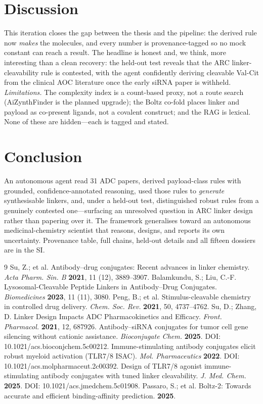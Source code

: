 \documentclass[10pt]{article}
\begin{document}
\section{Discussion}This iteration closes the gap between the thesis and the pipeline: the derived rule now \emph{makes} the molecules, and every number is provenance-tagged so no mock constant can reach a result. The headline is honest and, we think, more interesting than a clean recovery: the held-out test reveals that the ARC linker-cleavability rule is contested, with the agent confidently deriving cleavable Val-Cit from the clinical AOC literature once the early siRNA paper is withheld. \emph{Limitations.} The complexity index is a count-based proxy, not a route search (AiZynthFinder is the planned upgrade); the Boltz co-fold places linker and payload as co-present ligands, not a covalent construct; and the RAG is lexical. None of these are hidden---each is tagged and stated.
\section{Conclusion}An autonomous agent read 31 ADC papers, derived payload-class rules with grounded, confidence-annotated reasoning, used those rules to \emph{generate} synthesisable linkers, and, under a held-out test, distinguished robust rules from a genuinely contested one---surfacing an unresolved question in ARC linker design rather than papering over it. The framework generalises toward an autonomous medicinal-chemistry scientist that reasons, designs, and reports its own uncertainty. Provenance table, full chains, held-out details and all fifteen dossiers are in the SI.
\begin{thebibliography}{9}
 Su, Z.; et al. Antibody--drug conjugates: Recent advances in linker chemistry. \emph{Acta Pharm. Sin. B} \textbf{2021}, 11 (12), 3889--3907.
 Balamkundu, S.; Liu, C.-F. Lysosomal-Cleavable Peptide Linkers in Antibody--Drug Conjugates. \emph{Biomedicines} \textbf{2023}, 11 (11), 3080.
 Peng, B.; et al. Stimulus-cleavable chemistry in controlled drug delivery. \emph{Chem. Soc. Rev.} \textbf{2021}, 50, 4737--4762.
 Su, D.; Zhang, D. Linker Design Impacts ADC Pharmacokinetics and Efficacy. \emph{Front. Pharmacol.} \textbf{2021}, 12, 687926.
 Antibody--siRNA conjugates for tumor cell gene silencing without cationic assistance. \emph{Bioconjugate Chem.} \textbf{2025}. DOI: 10.1021/acs.bioconjchem.5c00212.
 Immune-stimulating antibody conjugates elicit robust myeloid activation (TLR7/8 ISAC). \emph{Mol. Pharmaceutics} \textbf{2022}. DOI: 10.1021/acs.molpharmaceut.2c00392.
 Design of TLR7/8 agonist immune-stimulating antibody conjugates with tuned linker cleavability. \emph{J. Med. Chem.} \textbf{2025}. DOI: 10.1021/acs.jmedchem.5c01908.
 Passaro, S.; et al. Boltz-2: Towards accurate and efficient binding-affinity prediction. \textbf{2025}.
\end{thebibliography}
\end{document}
